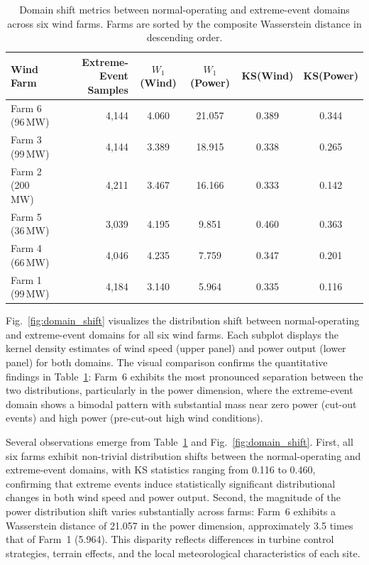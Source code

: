 \begin{table}[ht]
\centering
\caption{Domain shift metrics between normal-operating and extreme-event domains across six wind farms. Farms are sorted by the composite Wasserstein distance in descending order.}
\setlength{\tabcolsep}{3mm}
\begin{tabular}{lrcccc}
\toprule
Wind Farm & Extreme-Event Samples & $W_1$(Wind) & $W_1$(Power) & KS(Wind) & KS(Power) \\
\midrule
Farm 6 (96\,MW)  & 4{,}144 & 4.060 & 21.057 & 0.389 & 0.344 \\
Farm 3 (99\,MW)  & 4{,}144 & 3.389 & 18.915 & 0.338 & 0.265 \\
Farm 2 (200\,MW) & 4{,}211 & 3.467 & 16.166 & 0.333 & 0.142 \\
Farm 5 (36\,MW)  & 3{,}039 & 4.195 &  9.851 & 0.460 & 0.363 \\
Farm 4 (66\,MW)  & 4{,}046 & 4.235 &  7.759 & 0.347 & 0.201 \\
Farm 1 (99\,MW)  & 4{,}184 & 3.140 &  5.964 & 0.335 & 0.116 \\
\bottomrule
\end{tabular}
\label{tab:exp1_shift}
\end{table}

Fig.~\ref{fig:domain_shift} visualizes the distribution shift between normal-operating and extreme-event domains for all six wind farms. Each subplot displays the kernel density estimates of wind speed (upper panel) and power output (lower panel) for both domains. The visual comparison confirms the quantitative findings in Table~\ref{tab:exp1_shift}: Farm~6 exhibits the most pronounced separation between the two distributions, particularly in the power dimension, where the extreme-event domain shows a bimodal pattern with substantial mass near zero power (cut-out events) and high power (pre-cut-out high wind conditions).

Several observations emerge from Table~\ref{tab:exp1_shift} and Fig.~\ref{fig:domain_shift}. First, all six farms exhibit non-trivial distribution shifts between the normal-operating and extreme-event domains, with KS statistics ranging from 0.116 to 0.460, confirming that extreme events induce statistically significant distributional changes in both wind speed and power output. Second, the magnitude of the power distribution shift varies substantially across farms: Farm~6 exhibits a Wasserstein distance of 21.057 in the power dimension, approximately 3.5 times that of Farm~1 (5.964). This disparity reflects differences in turbine control strategies, terrain effects, and the local meteorological characteristics of each site.

